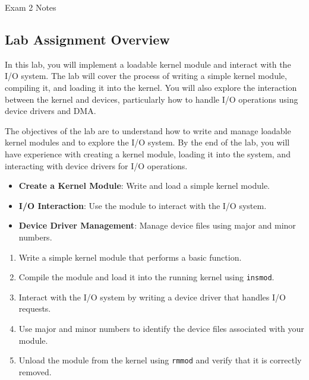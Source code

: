 \begin{examnotes}{Exam 2 Notes}
    \subsection*{Lab Assignment Overview}
    
    In this lab, you will implement a loadable kernel module and interact with the I/O system. The lab will cover the process of writing a simple kernel module, compiling it, and loading it into the kernel. 
    You will also explore the interaction between the kernel and devices, particularly how to handle I/O operations using device drivers and DMA.
    
    \begin{highlight}
        The objectives of the lab are to understand how to write and manage loadable kernel modules and to explore the I/O system. By the end of the lab, you will have experience with creating a kernel module, 
        loading it into the system, and interacting with device drivers for I/O operations.
        \begin{itemize}
            \item \textbf{Create a Kernel Module}: Write and load a simple kernel module.
            \item \textbf{I/O Interaction}: Use the module to interact with the I/O system.
            \item \textbf{Device Driver Management}: Manage device files using major and minor numbers.
        \end{itemize}
    \end{highlight}
    
    \begin{highlight}
        \begin{enumerate}
            \item Write a simple kernel module that performs a basic function.
            \item Compile the module and load it into the running kernel using \texttt{insmod}.
            \item Interact with the I/O system by writing a device driver that handles I/O requests.
            \item Use major and minor numbers to identify the device files associated with your module.
            \item Unload the module from the kernel using \texttt{rmmod} and verify that it is correctly removed.
        \end{enumerate}
    \end{highlight}


\end{examnotes}
